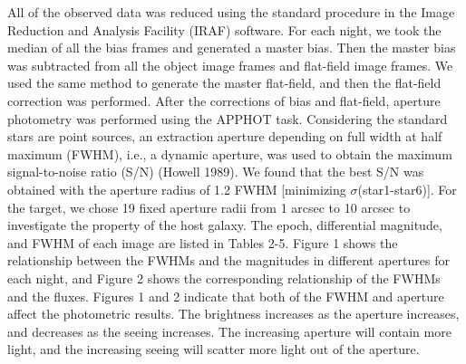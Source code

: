 \documentclass[structabstract]{raa}
\begin{document}
   All of the observed data was reduced using the standard procedure in the Image Reduction and Analysis Facility (IRAF) software.
   For each night, we took the median of all the bias frames and generated a master bias. Then the master bias was subtracted from
   all the object image frames and flat-field image frames. We used the same method to generate the master flat-field, and then
   the flat-field correction was performed. After the corrections of bias and flat-field, aperture photometry was performed using the
   APPHOT task. Considering the standard stars are point sources, an extraction aperture depending on full width at half maximum
   (FWHM), i.e., a dynamic aperture, was used to obtain the maximum signal-to-noise ratio (S/N) (Howell 1989). We found that the
   best S/N was obtained with the aperture radius of 1.2 FWHM [minimizing $\sigma$(star1-star6)]. For the target, we chose 19 fixed
   aperture radii from 1 arcsec to 10 arcsec to investigate the property of the host galaxy. The epoch, differential magnitude, and FWHM
   of each image are listed in Tables 2-5. Figure 1 shows the relationship between the FWHMs and the magnitudes in different apertures
   for each night, and Figure 2 shows the corresponding relationship of the FWHMs and the fluxes. Figures 1 and 2 indicate that both
   of the FWHM and aperture affect the photometric results. The brightness increases as the aperture increases, and decreases as the
   seeing increases. The increasing aperture will contain more light, and the increasing seeing will scatter more light out of the aperture.
\end{document}

